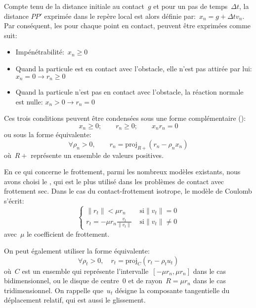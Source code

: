 Compte tenu de la distance initiale au contact~$g$ et pour un pas de temps~$\Delta t$, la distance
$PP'$ exprimée dans le repère local est alors définie par:~$x_n = g + \Delta t v_n$.
Par conséquent, les  pour chaque point en contact,
peuvent être exprimées comme suit:
\begin{itemize}
  \item Impénétrabilité:~$x_n \ge 0$
  \item Quand la particule est en contact avec l'obstacle, elle n'est pas attirée par lui:
	$x_n = 0 \rightarrow r_n \ge 0$
  \item Quand la particule n'est pas en contact avec l'obstacle, la réaction normale est nulle:
	$x_n > 0 \rightarrow r_n = 0$
\end{itemize}
Ces trois conditions peuvent être condensées sous une forme complémentaire ():
\begin{equation} x_n \ge 0; \qquad r_n \ge 0; \qquad x_n r_n = 0 \end{equation}
ou sous la forme équivalente:
\begin{equation} \forall \rho_n > 0, \qquad r_n = \mathrm{proj}_{R+} (r_n - \rho_n x_n) \end{equation}
où~$R+$ représente un ensemble de valeurs positives.

\medskip
En ce qui concerne le frottement, parmi les nombreux modèles existants, nous avons choisi le
,
qui est le plus utilisé dans les problèmes de contact avec frottement sec.
Dans le cas du contact-frottement isotrope, le modèle de Coulomb s'écrit:
\begin{equation} \left\{\begin{array}{ll}
\|r_t\| < \mu r_n & \text{ si} \|v_t\|=0\\
r_t=-\mu r_n \frac{v_t}{\|v_t\|} & \text{ si} \|v_t\|\ne0
\end{array}\right. \end{equation}
avec~$\mu$ le coefficient de frottement.

On peut également utiliser la forme équivalente:
\begin{equation} \forall \rho_t>0, \quad r_t= \mathrm{proj}_C (r_t-\rho_t u_t) \end{equation}
où~$C$ est un ensemble qui représente l'intervalle~$[-\mu r_n, \mu r_n]$ dans le cas bidimensionnel,
ou le disque de centre~$0$ et de rayon~$R= \mu r_n$ dans le cas tridimensionnel.
On rappelle que~$u_t$ désigne la composante tangentielle du déplacement relatif, qui est
aussi le glissement.

